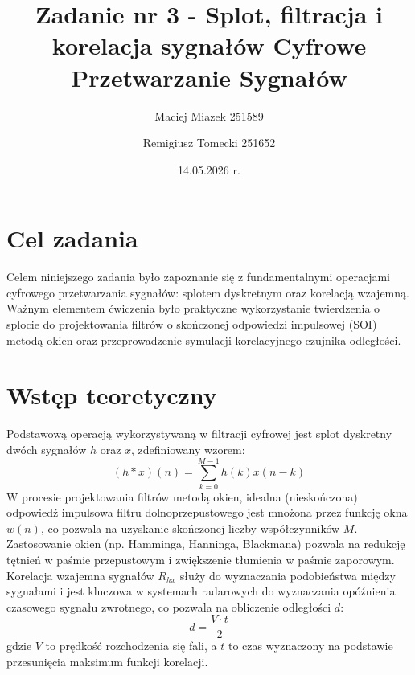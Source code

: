 \documentclass[12pt]{article}
\title{{\bf Zadanie nr 3 - Splot, filtracja i korelacja sygnałów}\linebreak
Cyfrowe Przetwarzanie Sygnałów}
\author{Maciej Miazek 251589 \and Remigiusz Tomecki 251652}
\date{14.05.2026 r.}
\begin{document}
\clearpage\maketitle
\thispagestyle{empty}
\newpage
\setcounter{page}{1}

\section{Cel zadania}
Celem niniejszego zadania było zapoznanie się z fundamentalnymi operacjami cyfrowego przetwarzania sygnałów: splotem dyskretnym oraz korelacją wzajemną. Ważnym elementem ćwiczenia było praktyczne wykorzystanie twierdzenia o splocie do projektowania filtrów o skończonej odpowiedzi impulsowej (SOI) metodą okien oraz przeprowadzenie symulacji korelacyjnego czujnika odległości.
\section{Wstęp teoretyczny}
Podstawową operacją wykorzystywaną w filtracji cyfrowej jest splot dyskretny dwóch sygnałów $h$ oraz $x$, zdefiniowany wzorem:
\begin{equation}
(h*x)(n) = \sum_{k=0}^{M-1} h(k)x(n-k)
\end{equation}
W procesie projektowania filtrów metodą okien, idealna (nieskończona) odpowiedź impulsowa filtru dolnoprzepustowego jest mnożona przez funkcję okna $w(n)$, co pozwala na uzyskanie skończonej liczby współczynników $M$. Zastosowanie okien (np. Hamminga, Hanninga, Blackmana) pozwala na redukcję tętnień w paśmie przepustowym i zwiększenie tłumienia w paśmie zaporowym.
Korelacja wzajemna sygnałów $R_{hx}$ służy do wyznaczania podobieństwa między sygnałami i jest kluczowa w systemach radarowych do wyznaczania opóźnienia czasowego sygnału zwrotnego, co pozwala na obliczenie odległości $d$:
\begin{equation}
d = \frac{V \cdot t}{2}
\end{equation}
gdzie $V$ to prędkość rozchodzenia się fali, a $t$ to czas wyznaczony na podstawie przesunięcia maksimum funkcji korelacji.
\end{document}
